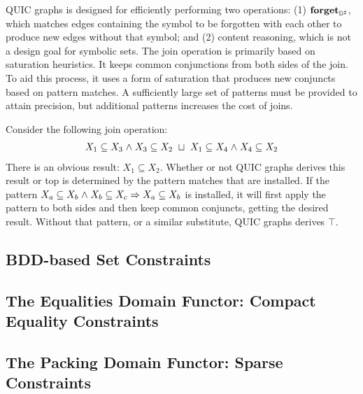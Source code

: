 QUIC graphs is designed for efficiently performing two operations: (1) $\textbf{forget}_{{\mathbb{D}}^{\sharp}}$, which matches edges containing the symbol to be forgotten with each other to produce new edges without that symbol; and (2) content reasoning, which is not a design goal for symbolic sets.  The join operation is primarily based on saturation heuristics.  It keeps common conjunctions from both sides of the join.  To aid this process, it uses a form of saturation that produces new conjuncts based on pattern matches.  A sufficiently large set of patterns must be provided to attain precision, but additional patterns increases the cost of joins.
\begin{example}  Consider the following join operation:
    \begin{align*}
      X_1 \subseteq X_3 \mathrel{\wedge} X_3 \subseteq X_2 \ \sqcup \ X_1 \subseteq X_4 \mathrel{\wedge} X_4 \subseteq X_2
    \end{align*}
    There is an obvious result: $X_1 \subseteq X_2$.  Whether or not QUIC graphs derives this result or top is determined by the pattern matches that are installed.  If the pattern $X_a \subseteq X_b \mathrel{\wedge} X_b \subseteq X_c \Rightarrow X_a \subseteq X_b$ is installed, it will first apply the pattern to both sides and then keep common conjuncts, getting the desired result.  Without that pattern, or a similar substitute, QUIC graphs derives $\top$.
\end{example}

\subsection{BDD-based Set Constraints}
\label{s:4:3:bdd}

\subsection{The Equalities Domain Functor: Compact Equality Constraints}
\label{s:4:4:eqs}

\subsection{The Packing Domain Functor: Sparse Constraints}
\label{s:4:5:packs}
